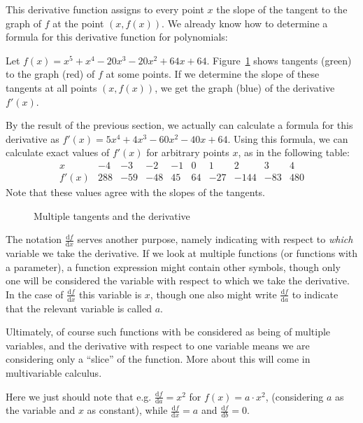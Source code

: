 This derivative function assigns to every point $x$ the slope of the tangent
to the graph of $f$ at the point $(x,f(x))$.
We already know how to determine a formula for this derivative function for
polynomials:
\begin{bsp}
Let $f(x)=x^{5}+x^{4}-20x^{3}-20x^{2}+64x+64$.
Figure~\ref{figmultitangent} shows tangents (green) to the graph (red) of $f$
at some points. If we determine the slope of these tangents at all points
$(x,f(x))$, we get the graph (blue) of the derivative $f'(x)$.

By the result of the previous section, we actually can calculate a formula
for this derivative as $f'(x)=5x^{4}+4x^{3}-60x^{2}-40x+64$. Using
this formula, we can calculate exact values of $f'(x)$ for arbitrary points $x$, as in the following table:
\[
\begin{array}{r|rrrrrrrrr}
x&-4&-3&-2&-1&0&1&2&3&4\\
\hline
f'(x)&288&-59&-48&45&64&-27&-144&-83&480
\end{array}
\]
Note that these values agree with the slopes of the tangents.
\end{bsp}
\begin{figure}[t]
\begin{center}
\end{center}
\caption{Multiple tangents and the derivative}
\label{figmultitangent}
\end{figure}

\begin{note}
The notation $\displaystyle\frac{\mbox{d}f}{\mbox{d}x}$ serves another
purpose, namely indicating with respect to {\em which} variable we take the
derivative. If we look at multiple functions (or functions with a
parameter), a function expression might contain other symbols, though only
one will be considered the variable with respect to which we take the
derivative. In the case of $\displaystyle\frac{\mbox{d}f}{\mbox{d}x}$ this
variable is $x$, though one also might write
$\displaystyle\frac{\mbox{d}f}{\mbox{d}a}$ to indicate that the relevant
variable is called $a$.

Ultimately, of course such functions with be considered as being of multiple
variables, and the derivative with respect to one variable means we are
considering only a ``slice'' of the function. More about this will come in
multivariable calculus.

Here we just should note that e.g.
$\displaystyle\frac{\mbox{d}f}{\mbox{d}a}=x^2$ for $f(x)=a\cdot x^2$,
(considering $a$ as the variable and $x$ as constant), while
$\displaystyle\frac{\mbox{d}f}{\mbox{d}x}=a$ and
$\displaystyle\frac{\mbox{d}f}{\mbox{d}b}=0$.
\end{note}

